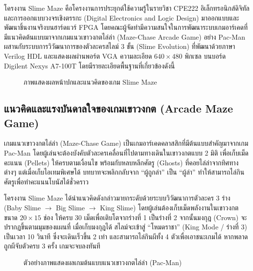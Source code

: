 
โครงงาน \textenglish{Slime Maze} คือโครงงานการประยุกต์ใช้ความรู้ในรายวิชา \textenglish{CPE222} อิเล็กทรอนิกส์ดิจิทัลและการออกแบบวงจรเชิงตรรกะ (Digital Electronics and Logic Design) มาออกแบบและพัฒนาชิ้นงานจริงบนฮาร์ดแวร์ FPGA โดยคณะผู้จัดทำมีความสนใจในการพัฒนาระบบเกมอาร์เคดที่มีแนวคิดต้นแบบมาจากเกมแนวเขาวงกตไล่ล่า (Maze-Chase Arcade Game) อย่าง \textenglish{Pac-Man} ผสานกับระบบการวิวัฒนาการของตัวละครสไลม์ 3 ขั้น (Slime Evolution) ที่พัฒนาด้วยภาษา Verilog HDL และแสดงผลผ่านพอร์ต VGA ความละเอียด $640\times480$ พิกเซล บนบอร์ด Digilent Nexys A7-100T โดยมีรายละเอียดพื้นฐานที่เกี่ยวข้องดังนี้

\begin{figure}[H]
    \centering
    \caption{ภาพแสดงผลหน้าปกและแนวคิดของเกม Slime Maze}
\end{figure}

\subsection{แนวคิดและแรงบันดาลใจของเกมเขาวงกต (Arcade Maze Game)}

เกมแนวเขาวงกตไล่ล่า (Maze-Chase Game) เป็นเกมอาร์เคดคลาสสิกที่มีต้นแบบสำคัญมาจากเกม Pac-Man โดยผู้เล่นจะต้องบังคับตัวละครเคลื่อนที่ไปตามทางเดินในเขาวงกตแบบ 2 มิติ เพื่อเก็บเม็ดคะแนน (Pellets) ให้ครบตามเงื่อนไข พร้อมกับหลบหลีกศัตรู (Ghosts) ที่คอยไล่ล่าจากทิศทางต่างๆ แต่เมื่อเก็บไอเทมพิเศษได้ บทบาทจะพลิกกลับจาก “ผู้ถูกล่า” เป็น “ผู้ล่า” ทำให้สามารถไล่กินศัตรูเพื่อทำคะแนนโบนัสได้ชั่วคราว

โครงงาน Slime Maze ได้นำแนวคิดดังกล่าวมายกระดับด้วยระบบวิวัฒนาการตัวละคร 3 ร่าง (Baby Slime $\rightarrow$ Big Slime $\rightarrow$ King Slime) โดยผู้เล่นต้องเก็บเม็ดพลังงานในเขาวงกตขนาด $20\times15$ ช่อง ให้ครบ 30 เม็ดเพื่อเติบโตจากร่างที่ 1 เป็นร่างที่ 2 จากนั้นมงกุฎ (Crown) จะปรากฏขึ้นตามมุมของแผนที่ เมื่อเก็บมงกุฎได้ สไลม์จะเข้าสู่ “โหมดราชา” (King Mode / ร่างที่ 3) เป็นเวลา 10 วินาที ซึ่งจะเดินเร็วขึ้น 2 เท่า และสามารถไล่กินผีทั้ง 4 ตัวเพื่อเอาชนะเกมได้ หากพลาดถูกผีจับตัวครบ 3 ครั้ง เกมจะจบลงทันที

\begin{figure}[H]
    \centering
    \caption{ตัวอย่างภาพแสดงผลเกมต้นแบบแนวเขาวงกตไล่ล่า (Pac-Man)}
\end{figure}

